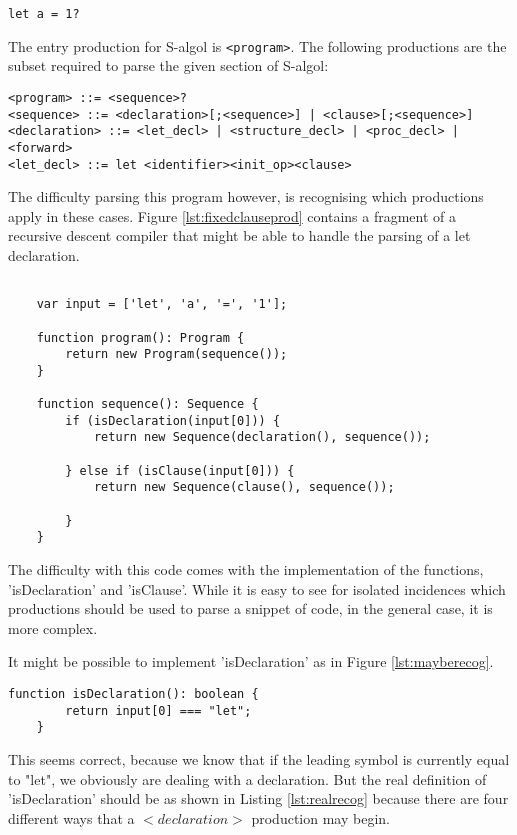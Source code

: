 \documentclass{article}
\begin{document}
\begin{lstlisting}[label={lst:trivialsal}]
let a = 1?
\end{lstlisting}

The entry production for S-algol is \lstinline{<program>}. The following productions are the subset required to parse the given section of S-algol:

\begin{lstlisting}[caption={TODO},label={lst:fixedclauseprod}]
<program> ::= <sequence>?
<sequence> ::= <declaration>[;<sequence>] | <clause>[;<sequence>]
<declaration> ::= <let_decl> | <structure_decl> | <proc_decl> | <forward>
<let_decl> ::= let <identifier><init_op><clause>
\end{lstlisting}

The difficulty parsing this program however, is recognising which productions apply in these cases. Figure \ref{lst:fixedclauseprod} contains a fragment of a recursive descent compiler that might be able to handle the parsing of a let declaration.

\begin{lstlisting}[caption=TODO: caption,label=lst:fixedclauseprod]

    var input = ['let', 'a', '=', '1'];
    
    function program(): Program {
    	return new Program(sequence());
    }
    
    function sequence(): Sequence {
    	if (isDeclaration(input[0])) {
    		return new Sequence(declaration(), sequence());
    
    	} else if (isClause(input[0])) {
    		return new Sequence(clause(), sequence());
    
    	}
    }
\end{lstlisting}


The difficulty with this code comes with the implementation of the functions, 'isDeclaration' and 'isClause'. While it is easy to see for isolated incidences which productions should be used to parse a snippet of code, in the general case, it is more complex.

It might be possible to implement 'isDeclaration' as in Figure \ref{lst:mayberecog}.

\begin{lstlisting}[caption=TODO: caption, label=lst:mayberecog]
    function isDeclaration(): boolean {
    	return input[0] === "let";
    }
\end{lstlisting}


This seems correct, because we know that if the leading symbol is currently equal to "let", we obviously are dealing with a declaration. But the real definition of 'isDeclaration' should be as shown in Listing \ref{lst:realrecog} because there are four different ways that a $<declaration>$ production may begin.
\end{document}
